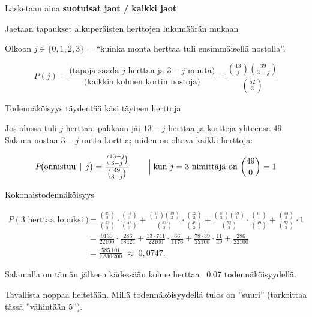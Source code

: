 \documentclass[12pt,a4paper]{article}
\begin{document}
Lasketaan aina \textbf{suotuisat jaot / kaikki jaot}
    
\begin{alakohta}
    
\item Jaetaan tapaukset alkuperäisten herttojen lukumäärän mukaan

Olkoon $j\in\{0,1,2,3\}$ = “kuinka monta herttaa tuli ensimmäisellä nostolla”.

\[
P(j)=\frac{\text{(tapoja saada $j$ herttaa ja $3-j$ muuta)}}{\text{(kaikkia kolmen kortin nostoja)}}=
\frac{\binom{13}{j}\binom{39}{3-j}}{\binom{52}{3}}
\]

\item Todennäköisyys täydentää käsi täyteen herttoja

Jos alussa tuli $j$ herttaa, pakkaan jäi $13-j$ herttaa ja kortteja yhteensä $49$.  
Salama nostaa $3-j$ uutta korttia; niiden on oltava kaikki herttoja:


\[
P\!\bigl(\text{onnistuu}\,\mid \,j\bigr)=
\frac{\binom{13-j}{3-j}}{\binom{49}{3-j}}
\qquad \Bigm| \text{kun }j=3\text{ nimittäjä on } \binom{49}{0}=1
\]

\item Kokonaistodennäköisyys

\[
\begin{aligned}
P(\text{3 herttaa lopuksi})
&=\frac{\binom{39}{3}}{\binom{52}{3}}\cdot\frac{\binom{13}{3}}{\binom{49}{3}}
 +\frac{\binom{13}{1}\binom{39}{2}}{\binom{52}{3}}\cdot\frac{\binom{12}{2}}{\binom{49}{2}}
+\frac{\binom{13}{2}\binom{39}{1}}{\binom{52}{3}}\cdot\frac{\binom{11}{1}}{\binom{49}{1}}
 +\frac{\binom{13}{3}}{\binom{52}{3}}\cdot 1 \\[6pt]
&=\frac{9139}{22100}\cdot\frac{286}{18424}
 + \frac{13\cdot 741}{22100}\cdot\frac{66}{1176}
 + \frac{78\cdot 39}{22100}\cdot\frac{11}{49}
 + \frac{286}{22100} \\[4pt]
&=\frac{585\,101}{7\,830\,200}
 \;\approx\;0{,}0747.
\end{aligned}
\]


Salamalla on tämän jälkeen 
kädessään kolme herttaa \approx\, 0.07 todennäköisyydellä.

\end{alakohta}









\pagebreak


Tavallista noppaa heitetään. Millä todennäköisyydellä tulos
on ''suuri'' (tarkoittaa tässä ''vähintään 5'').
\end{document}
